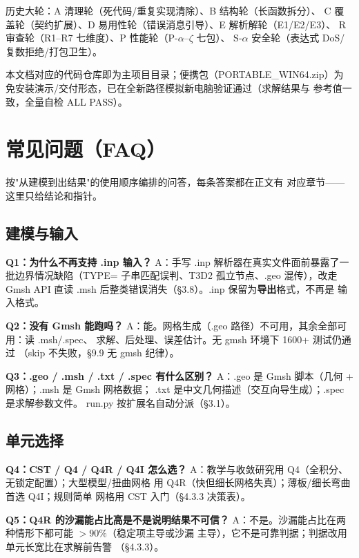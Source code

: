 \documentclass[12pt,a4paper]{ctexart}
\begin{document}
历史大轮：A 清理轮（死代码/重复实现清除）、B 结构轮（长函数拆分）、
C 覆盖轮（契约扩展）、D 易用性轮（错误消息引导）、E 解析解轮（E1/E2/E3）、
R 审查轮（R1--R7 七维度）、P 性能轮（P-$\alpha$--$\zeta$ 七包）、
S-$\alpha$ 安全轮（表达式 DoS/复数拒绝/打包卫生）。

本文档对应的代码仓库即为主项目目录；便携包（PORTABLE\_WIN64.zip）为
免安装演示/交付形态，已在全新路径模拟新电脑验证通过（求解结果与
参考值一致，全量自检 ALL PASS）。

\appendix
\section{常见问题（FAQ）}

按"从建模到出结果"的使用顺序编排的问答，每条答案都在正文有
对应章节——这里只给结论和指针。

\subsection{建模与输入}

\textbf{Q1：为什么不再支持 .inp 输入？}
A：手写 .inp 解析器在真实文件面前暴露了一批边界情况缺陷（TYPE=
子串匹配误判、T3D2 孤立节点、.geo 混传），改走 Gmsh API 直读
.msh 后整类错误消失（§3.8）。.inp 保留为\textbf{导出}格式，不再是
输入格式。

\textbf{Q2：没有 Gmsh 能跑吗？}
A：能。网格生成（.geo 路径）不可用，其余全部可用：读 .msh/.spec、
求解、后处理、误差估计。无 gmsh 环境下 1600+ 测试仍通过
（skip 不失败，§9.9 无 gmsh 纪律）。

\textbf{Q3：.geo / .msh / .txt / .spec 有什么区别？}
A：.geo 是 Gmsh 脚本（几何 + 网格）；.msh 是 Gmsh 网格数据；
.txt 是中文几何描述（交互向导生成）；.spec 是求解参数文件。
run.py 按扩展名自动分派（§3.1）。

\subsection{单元选择}

\textbf{Q4：CST / Q4 / Q4R / Q4I 怎么选？}
A：教学与收敛研究用 Q4（全积分、无锁定配置）；大型模型/扭曲网格
用 Q4R（快但细长网格失真）；薄板/细长弯曲首选 Q4I；规则简单
网格用 CST 入门（§4.3.3 决策表）。

\textbf{Q5：Q4R 的沙漏能占比高是不是说明结果不可信？}
A：不是。沙漏能占比在两种情形下都可能 $>90\%$（稳定项主导或沙漏
主导），它不是可靠判据；判据改用单元长宽比在求解前告警
（§4.3.3）。
\end{document}

